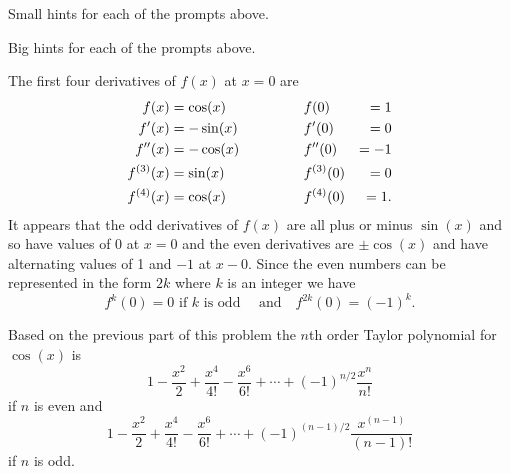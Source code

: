 \begin{smallhint}
\ba
	\item Small hints for each of the prompts above.
\ea
\end{smallhint}
\begin{bighint}
\ba
	\item Big hints for each of the prompts above.
\ea
\end{bighint}
\begin{activitySolution}
\ba
	\item
    \btl
    \item The first four derivatives of $f(x)$ at $x=0$ are
    \begin{align*}
f(x) &= \cos(x) & \hspace{0.5in} & f(0) &= 1 \\
f'(x) &= -\sin(x) & \hspace{0.5in} & f'(0) &= 0 \\
f''(x) &= -\cos(x) & \hspace{0.5in} & f''(0) &= -1 \\
f^{(3)}(x) &= \sin(x) & \hspace{0.5in} & f^{(3)}(0) &= 0 \\
f^{(4)}(x) &= \cos(x) & \hspace{0.5in} & f^{(4)}(0) &= 1. \\
\end{align*}
It appears that the odd derivatives of $f(x)$ are all plus or minus $\sin(x)$ and so have values of 0 at $x=0$ and the even derivatives are $\pm \cos(x)$ and have alternating values of 1 and $-1$ at $x-0$. Since the even numbers can be represented in the form $2k$ where $k$ is an integer we have
\[f^{k}(0) = 0 \text{ if } k \text{ is odd } \ \ \ \text{ and } \ \ \ f^{2k}(0) = (-1)^k.\]


    \item Based on the previous part of this problem the $n$th order Taylor polynomial for $\cos(x)$ is
    \[1 - \frac{x^2}{2} + \frac{x^4}{4!} - \frac{x^6}{6!} + \cdots + (-1)^{n/2}\frac{x^n}{n!}\]
    if $n$ is even and
    \[1 - \frac{x^2}{2} + \frac{x^4}{4!} - \frac{x^6}{6!} + \cdots + (-1)^{(n-1)/2}\frac{x^(n-1)}{(n-1)!}\]
    if $n$ is odd.

    \etl


\end{activitySolution}
